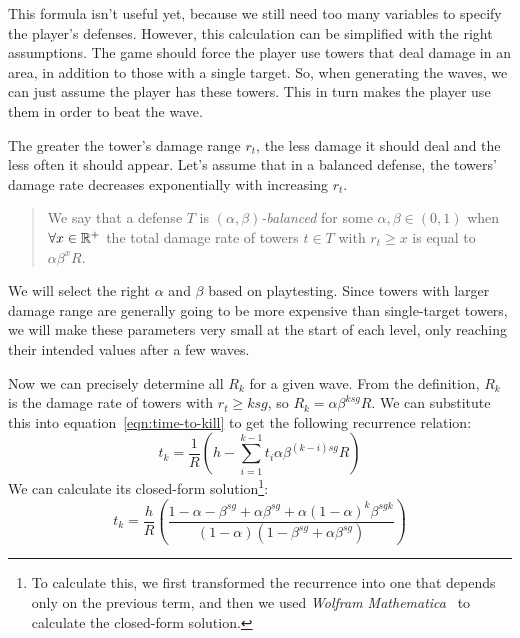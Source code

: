 This formula isn't useful yet, because we still need too many variables to specify the player's defenses.
However, this calculation can be simplified with the right assumptions.
The game should force the player use towers that deal damage in an area, in addition to those with a single target.
So, when generating the waves, we can just assume the player has these towers.
This in turn makes the player use them in order to beat the wave.

The greater the tower's damage range $r_t$, the less damage it should deal and the less often it should appear.
Let's assume that in a balanced defense, the towers' damage rate decreases exponentially with increasing $r_t$.
\begin{quotation}
    We say that a defense $T$ is $(\alpha, \beta)$\emph{-balanced} for some $\alpha,\beta \in (0,1)$ when $\forall x \in \mathbb{R}^+$ the total damage rate of towers $t \in T$ with $r_t \geq x$ is equal to $\alpha\beta^x R$.
\end{quotation}
We will select the right $\alpha$ and $\beta$ based on playtesting.
Since towers with larger damage range are generally going to be more expensive than single-target towers, we will make these parameters very small at the start of each level, only reaching their intended values after a few waves.

Now we can precisely determine all $R_k$ for a given wave.
From the definition, $R_k$ is the damage rate of towers with $r_t \geq ksg$, so $R_k = \alpha\beta^{ksg} R$.
We can substitute this into equation~\ref{eqn:time-to-kill} to get the following recurrence relation:
\begin{equation}
    t_k = \frac{1}{R}\left(h - \sum_{i=1}^{k-1} t_i \alpha\beta^{(k-i)sg} R\right)
\end{equation}
We can calculate its closed-form solution\footnote{To calculate this, we first transformed the recurrence into one that depends only on the previous term, and then we used \emph{Wolfram Mathematica}~\cite{Mathematica} to calculate the closed-form solution.}:
\begin{equation}
    t_k = \frac{h}{R}\left(\frac{
            1-\alpha-\beta^{sg}+\alpha\beta^{sg}+\alpha(1-\alpha)^k\beta^{sgk}
        }{
            (1-\alpha)(1-\beta^{sg}+\alpha\beta^{sg})
        }\right)
\end{equation}

